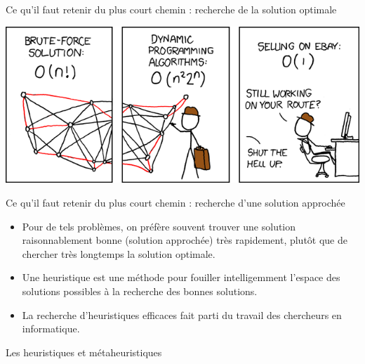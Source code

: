 \begin{frame}{Ce qu'il faut retenir du plus court chemin : recherche de la solution optimale}
  \begin{center}
    \includegraphics[width=0.7\linewidth]{img/tsp_xkcd.png}
    \label{img:tsp_xkcd}
  \end{center}

\end{frame}

\begin{frame}{Ce qu'il faut retenir du plus court chemin : recherche d'une solution approchée}

  \begin{itemize}
    \item Pour de tels problèmes, on préfère souvent trouver une solution raisonnablement bonne (solution approchée) très rapidement, plutôt que de chercher très longtemps la solution optimale. 
    \item Une \alert{heuristique} est une méthode pour fouiller intelligemment l'espace des solutions possibles à la recherche des bonnes solutions.
    \item La recherche d'heuristiques efficaces fait parti du travail des chercheurs en informatique.
  \end{itemize}
  
  \begin{block}{Les heuristiques et métaheuristiques}


\end{block}
\end{frame}
